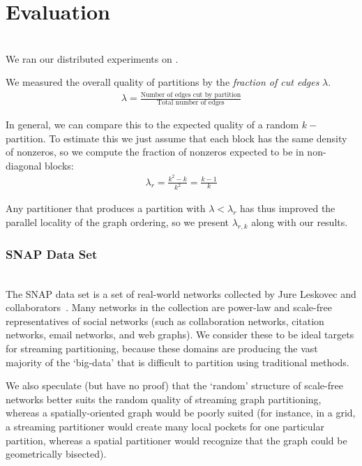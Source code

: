 \section{Evaluation}
\\
We ran our distributed experiments on .

We measured the overall quality of partitions by the \textit{fraction of cut edges} $\lambda$.
\begin{align}\lambda = \frac{\text{Number of edges cut by partition}}{\text{Total number of edges}}\end{align}

In general, we can compare this to the expected quality of a random $k-$partition. To estimate this we just assume that each block has the same density of nonzeros, so we compute the fraction of nonzeros expected to be in non-diagonal blocks:
\begin{align}\lambda_r = \frac{k^2 - k}{k^2} = \frac{k-1}{k} \end{align}

Any partitioner that produces a partition with $\lambda < \lambda_r$ has thus improved the parallel locality of the graph ordering, so we present $\lambda_{r,k}$ along with our results.

\subsubsection{SNAP Data Set}
\\
The SNAP data set is a set of real-world networks collected by Jure Leskovec and collaborators~\cite{Leskovec-data}. Many networks in the collection are power-law and scale-free representatives of social networks (such as collaboration networks, citation networks, email networks, and web graphs). We consider these to be ideal targets for streaming partitioning, because these domains are producing the vast majority of the `big-data' that is difficult to partition using traditional methods. 

We also speculate (but have no proof) that the `random' structure of scale-free networks better suits the random quality of streaming graph partitioning, whereas a spatially-oriented graph would be poorly suited (for instance, in a grid, a streaming partitioner would create many local pockets for one particular partition, whereas a spatial partitioner would recognize that the graph could be geometrically bisected). 


